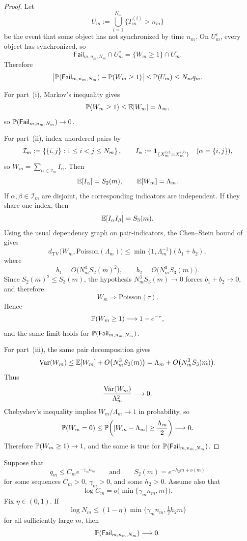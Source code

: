 \begin{proof}
Let
\[
  U_m:=\bigcup_{i=1}^{N_m}\{T_m^{(i)}>n_m\}
\]
be the event that some object has not synchronized by time \(n_m\).
On \(U_m^c\), every object has synchronized, so
\[
  \mathsf{Fail}_{m,n_m,N_m}\cap U_m^c
  = \{W_m\geq 1\}\cap U_m^c.
\]
Therefore
\[
  \bigl|
    \mathbb{P}(\mathsf{Fail}_{m,n_m,N_m})
    - \mathbb{P}(W_m\geq 1)
  \bigr|
  \leq \mathbb{P}(U_m)
  \leq N_m q_m.
\]

For part~(i), Markov's inequality gives
\[
  \mathbb{P}(W_m\geq 1)\leq \mathbb{E}[W_m]=\Lambda_m,
\]
so \(\mathbb{P}(\mathsf{Fail}_{m,n_m,N_m})\to 0\).

For part~(ii), index unordered pairs by
\[
  \mathcal{I}_m:=\left\{\{i,j\}:1\leq i<j\leq N_m\right\},
  \qquad
  I_\alpha:=\mathbf{1}_{\{X_m^{(i)}=X_m^{(j)}\}}
  \quad (\alpha=\{i,j\}),
\]
so \(W_m=\sum_{\alpha\in\mathcal{I}_m}I_\alpha\).  Then
\[
  \mathbb{E}[I_\alpha]=S_2(m),
  \qquad
  \mathbb{E}[W_m]=\Lambda_m.
\]
If \(\alpha,\beta\in\mathcal{I}_m\) are disjoint, the corresponding
indicators are independent.  If they share one index, then
\[
  \mathbb{E}[I_\alpha I_\beta]=S_3(m).
\]
Using the usual dependency graph on pair-indicators, the Chen--Stein
bound of \citet[Theorem~1]{ArratiaGoldsteinGordon1989} gives
\[
  d_{\mathrm{TV}}
   \bigl(W_m,\mathrm{Poisson}(\Lambda_m)\bigr)
  \leq \min\{1,\Lambda_m^{-1}\}(b_1+b_2),
\]
where
\[
  b_1=O\bigl(N_m^3S_2(m)^2\bigr),
  \qquad
  b_2=O\bigl(N_m^3S_3(m)\bigr).
\]
Since \(S_2(m)^2\leq S_3(m)\), the hypothesis
\(N_m^3S_3(m)\to 0\) forces \(b_1+b_2\to 0\), and therefore
\[
  W_m \Rightarrow \mathrm{Poisson}(\tau).
\]
Hence
\[
  \mathbb{P}(W_m\geq 1)\longrightarrow 1-e^{-\tau},
\]
and the same limit holds for \(\mathbb{P}(\mathsf{Fail}_{m,n_m,N_m})\).

For part~(iii), the same pair decomposition gives
\[
  \operatorname{Var}(W_m)
  \leq \mathbb{E}[W_m] + O\bigl(N_m^3S_3(m)\bigr)
  = \Lambda_m + O\bigl(N_m^3S_3(m)\bigr).
\]
Thus
\[
  \frac{\operatorname{Var}(W_m)}{\Lambda_m^2}\longrightarrow 0.
\]
Chebyshev's inequality implies \(W_m/\Lambda_m\to 1\) in probability, so
\[
  \mathbb{P}(W_m=0)\leq
  \mathbb{P}\!\left(\lvert W_m-\Lambda_m\rvert\geq \frac{\Lambda_m}{2}\right)
  \longrightarrow 0.
\]
Therefore \(\mathbb{P}(W_m\geq 1)\to 1\), and the same is true for
\(\mathbb{P}(\mathsf{Fail}_{m,n_m,N_m})\).
\end{proof}

\begin{corollary}
\label{cor:capacity-region}
Suppose that
\[
  q_m\leq C_m e^{-\gamma_m n_m}
  \qquad\text{and}\qquad
  S_2(m)=e^{-h_2m+o(m)}
\]
for some sequences \(C_m>0\), \(\gamma_m>0\), and some \(h_2>0\).
Assume also that
\[
  \log C_m=o\bigl(\min\{\gamma_m n_m,m\}\bigr).
\]
Fix \(\eta\in(0,1)\).  If
\[
  \log N_m
  \leq (1-\eta)\min\bigl\{\gamma_m n_m,\tfrac12 h_2m\bigr\}
\]
for all sufficiently large \(m\), then
\[
  \mathbb{P}(\mathsf{Fail}_{m,n_m,N_m})\longrightarrow 0.
\]
\end{corollary}

